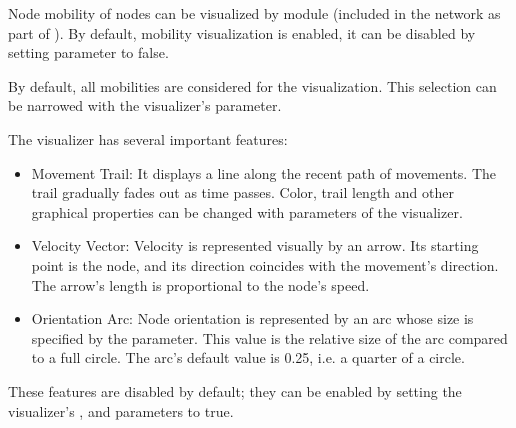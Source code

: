 Node mobility of nodes can be visualized by  module
(included in the network as part of ). By default,
mobility visualization is enabled, it can be disabled by setting
 parameter to false.

By default, all mobilities are considered for the visualization. This selection
can be narrowed with the visualizer's  parameter.

The visualizer has several important features:

\begin{itemize}
  \item Movement Trail: It displays a line along the recent path of movements.
        The trail gradually fades out as time passes. Color, trail length and
        other graphical properties can be changed with parameters of the
        visualizer.
  \item Velocity Vector: Velocity is represented visually by an arrow. Its
        starting point is the node, and its direction coincides with the
        movement's direction. The arrow's length is proportional to the node's
       speed.
  \item Orientation Arc: Node orientation is represented by an arc whose size
       is specified by the  parameter. This value is the
       relative size of the arc compared to a full circle. The arc's default
       value is 0.25, i.e. a quarter of a circle.
\end{itemize}

These features are disabled by default; they can be enabled by setting the
visualizer's ,  and
 parameters to true.




